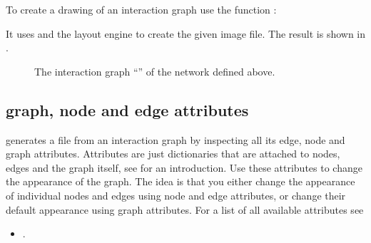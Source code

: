 \documentclass[letterpaper,10pt,english]{sphinxmanual}
\begin{document}
To create a drawing of an interaction graph use the function {\hyperref[\detokenize{InteractionGraphs:igraph2image}]{}}:

\begin{sphinxVerbatim}[commandchars=\\\{\}]
 
\end{sphinxVerbatim}

It uses {\hyperref[\detokenize{Installation:installation-graphviz}]{}} and the layout engine  to create the given image file.
The result is shown in {\hyperref[\detokenize{Manual:figure01}]{}}.

\begin{figure}[htbp]
\centering
\capstart

\noindent{}
\caption{The interaction graph “” of the network defined above.}\label{\detokenize{Manual:figure01}}\label{\detokenize{Manual:id6}}\end{figure}


\subsection{graph, node and edge attributes}
\label{\detokenize{Manual:graph-node-and-edge-attributes}}
 generates a  file from an interaction graph by inspecting all its edge, node and graph attributes.
Attributes are just dictionaries that are attached to nodes, edges and the graph itself, see {\hyperref[\detokenize{Installation:installation-networkx}]{}} for an introduction.
Use these attributes to change the appearance of the graph.
The idea is that you either change the appearance of individual nodes and edges using node and edge attributes,
or change their default appearance using graph attributes.
For a list of all available attributes see
\begin{itemize}
\item {} 
.

\end{itemize}
\end{document}
